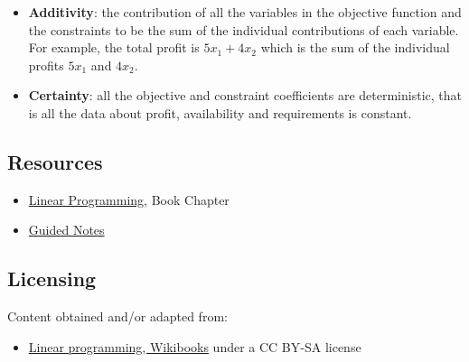 \begin{itemize}
    \item \textbf{Additivity}: the contribution of all the variables in the objective function and the constraints to be the sum of the individual contributions of each variable. For example, the total profit is $5x _1+4x _2$ which is the sum of the individual profits $5x _1$ and $4x _2$.
\end{itemize}

\begin{itemize}
    \item \textbf{Certainty}: all the objective and constraint coefficients are deterministic, that is all the data about profit, availability and requirements is constant.
\end{itemize}


\subsection{Resources}
\label{sss:reso-55b5}




\begin{itemize}
    \item \href{https://mathresearch.utsa.edu/wikiFiles/MAT1053/Linear_Programming/MAT1053_M9.2Linear_Programming.pdf}{Linear Programming}, Book Chapter
    \item \href{https://mathresearch.utsa.edu/wikiFiles/MAT1053/Linear_Programming/MAT1053_M9.2Linear_ProgrammingGN.pdf}{Guided Notes}
\end{itemize}


\subsection{Licensing}
\label{sss:lice-7352}




Content obtained and/or adapted from:



\begin{itemize}
    \item \href{https://en.wikibooks.org/wiki/Operations_Research/Linear_Programming}{Linear programming, Wikibooks} under a CC BY-SA license
\end{itemize}


